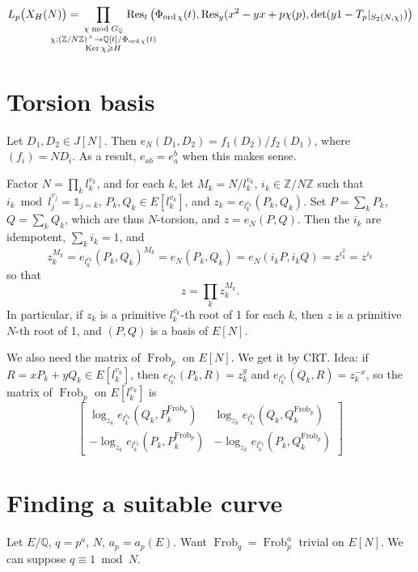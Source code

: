 \documentclass[12pt]{article}
\newcommand{\Z}{\mathbb{Z}}
\newcommand{\Q}{\mathbb{Q}}
\newcommand{\Ker}{\operatorname{Ker}}
\newcommand{\Res}{\operatorname{Res}}
\newcommand{\ord}{\operatorname{ord}}
\newcommand{\Frob}{\operatorname{Frob}}
\theoremstyle{definition}
\begin{document}
\[ L_p\big(X_H(N)\big) = \hspace{-1cm} \prod_{\substack{\chi \bmod G_\Q \\ \chi : (\Z/N\Z)^\times \rightarrow \Q[t]/\Phi_{\ord \chi}(t) \\ \Ker \chi \geqslant H}} \hspace{-1cm} \Res_t\big( \Phi_{\ord \chi}(t),\Res_y(x^2-yx+p\chi(p), \det(y1-T_p \vert_{S_2(N,\chi)}) \big) \]

\section{Torsion basis}

Let $D_1, D_2 \in J[N]$. Then $e_N(D_1,D_2) = f_1(D_2)/f_2(D_1)$, where $(f_i) = N D_i$. As a result, $e_{ab} = e_a^b$ when this makes sense.

Factor $N = \prod_k l_k^{v_k}$, and for each $k$, let $M_k = N/l_k^{v_k}$, $i_k \in \Z/N\Z$ such that $i_k \bmod l_j^{v_j} = \mathds{1}_{j=k}$, $P_k, Q_k \in E[l_k^{v_k}]$, and $z_k = e_{l_k^{v_k}}(P_k,Q_k)$. Set $P = \sum_k P_k$, $Q = \sum_k Q_k$, which are thus $N$-torsion, and $z=e_N(P,Q)$. Then the $i_k$ are idempotent, $\sum_k i_k = 1$, and
\[ z_k^{M_k} = e_{l_k^{v_k}}(P_k,Q_k)^{M_k} = e_N(P_k,Q_k) = e_N(i_k P, i_k Q) = z ^{i_k^2} = z^{i_k} \]
so that
\[ z = \prod_k z_k^{M_k}. \]
In particular, if $z_k$ is a primitive $l_k^{v_k}$-th root of 1 for each $k$, then $z$ is a primitive $N$-th root of 1, and $(P,Q)$ is a basis of $E[N]$.

We also need the matrix of $\Frob_p$ on $E[N]$. We get it by CRT. Idea: if $R = x P_k + y Q_k \in E[l_k^{v_k}]$, then $e_{l_k^{v_k}}(P_k,R) = z_k^y$ and $e_{l_k^{v_k}}(Q_k,R) = z_k^{-x}$, so the matrix of $\Frob_p$ on $E[l_k^{v_k}]$ is
\[ \left[ \begin{matrix} \log_{z_k} e_{l_k^{v_k}}(Q_k,P_k^{\Frob_p}) & \log_{z_k} e_{l_k^{v_k}}(Q_k,Q_k^{\Frob_p}) \\ -\log_{z_k} e_{l_k^{v_k}}(P_k,P_k^{\Frob_p}) & -\log_{z_k} e_{l_k^{v_k}}(P_k,Q_k^{\Frob_p}) \end{matrix} \right] \]

\section{Finding a suitable curve}

Let $E/\Q$, $q=p^a$, $N$, $a_p=a_p(E)$. Want $\Frob_q = \Frob_p^a$ trivial on $E[N]$. We can suppose $q \equiv 1 \bmod N$.
\end{document}
